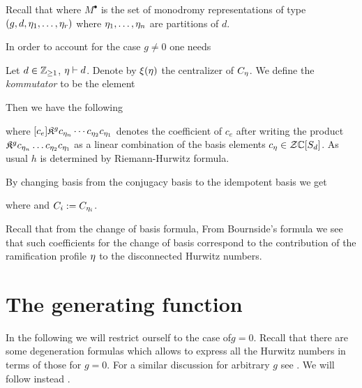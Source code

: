 \documentclass[../main/main.tex]{subfiles}
\begin{document}
Recall that 
where $M^\bullet$ is the set of monodromy representations of type $(g,d,\eta_1,\ldots,\eta_r)$ where $\eta_1,\ldots,\eta_n$ are partitions of $d$. 

In order to account for the case $g\neq0$ one needs 
\begin{definition}
	Let $d\in\mathbb Z_{\geq1}$, $\eta\vdash d$. Denote by $\xi(\eta)$ the centralizer of $C_\eta$. We define the \emph{kommutator} to be the element
\end{definition}

Then we have the following
\begin{proposition}[{\cite[Prop. 9.2.3]{CM}}]
	where $[c_e]\mathfrak K^gc_{\eta_n}\cdots c_{\eta_2}c_{\eta_1}$ denotes the coefficient of $c_e$ after writing the product $\mathfrak K^gc_{\eta_n}\ldots c_{\eta_2}c_{\eta_1}$ as a linear combination of the basis elements $c_\eta\in\mathcal Z\mathbb C[S_d]$. As usual $h$ is determined by Riemann-Hurwitz formula. 
\end{proposition}

By changing basis from the conjugacy basis to the idempotent basis we get

\begin{theorem}
	where
	and $C_i:=C_{\eta_i}$.
\end{theorem}

Recall that from the change of basis formula, 
From Bournside's formula we see that such coefficients for the change of basis correspond to the contribution of the ramification profile $\eta$ to the disconnected Hurwitz numbers. 


\section{The generating function}

In the following we will restrict ourself to the case of$g=0$. Recall that there are some degeneration formulas which allows to express all the Hurwitz numbers in terms of those for $g=0$. For a similar discussion for arbitrary $g$ see \cite[§10]{CM}. We will follow instead \cite[§§2.2,2.3]{O1}. 
\end{document}
